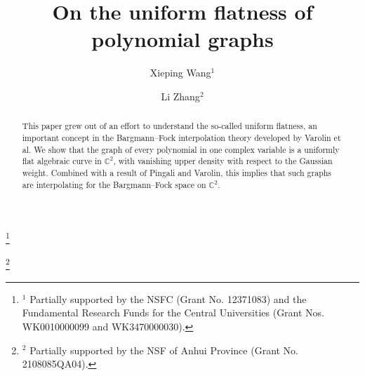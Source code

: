 \documentclass[12pt,a4paper]{amsart}
\numberwithin{equation}{section}
\theoremstyle{definition}
\begin{document}
\title[On the uniform flatness of polynomial graphs]{On the uniform flatness of polynomial graphs}

\author[Xieping Wang]{Xieping Wang$^1$}
\address{CAS Wu Wen-Tsun Key Laboratory of Mathematics and School of Mathematical Sciences, University of Science and Technology of China, Hefei 230026, Anhui, People's Republic of China}

\thanks{$^1$ Partially supported by the NSFC (Grant No. 12371083) and the Fundamental Research Funds for the Central Universities (Grant Nos. WK0010000099 and WK3470000030).}


\author[Li Zhang]{Li Zhang$^2$}
\address{School of Mathematics and Physics, Anhui Jianzhu University, Hefei 230601, Anhui, People's Republic of China}

\thanks{$^2$ Partially supported by the NSF of Anhui Province (Grant No. 2108085QA04).}







\begin{abstract}
This paper grew out of an effort to understand the so-called uniform flatness, an important concept in the Bargmann--Fock interpolation theory developed by Varolin et al. We show that the graph of every polynomial in one complex variable is a uniformly flat algebraic curve in $\mathbb C^2$, with vanishing upper density with respect to the Gaussian weight. Combined with a result of Pingali and Varolin, this implies that such graphs are interpolating for the Bargmann--Fock space on $\mathbb C^2$.
\end{abstract}
\maketitle
\end{document}
